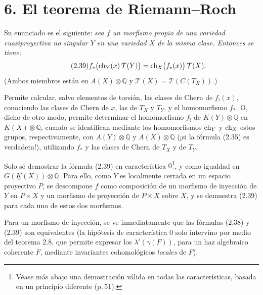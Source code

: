 \providecommand{\sisi}[2]{#2}

\section*{6. El teorema de Riemann--Roch}

Su enunciado es el siguiente: \emph{sea \(f\) un morfismo propio de una variedad cuasiproyectiva no singular \(Y\) en una variedad \(X\) de la misma clase. Entonces se tiene:}
\begin{equation}\tag{2.39}
 f_*\bigl(\operatorname{ch}_Y(x)\,\mathcal T(Y)\bigr)
 =
 \operatorname{ch}_X\bigl(f_*(x)\bigr)\,\mathcal T(X).
\end{equation}
(Ambos miembros están en \(A(X)\otimes\mathbb Q\) y \(\mathcal T(X)=\mathcal T(C(T_X))\).)

Permite calcular, salvo elementos de torsión, las clases de Chern de \(f_!(x)\), conociendo las clases de Chern de \(x\), las de \(T_X\) y \(T_Y\), y el homomorfismo \(f_*\). O, dicho de otro modo, permite determinar el homomorfismo
\(f_!\) de \(\underline K(Y)\otimes\mathbb Q\) en \(\underline K(X)\otimes\mathbb Q\), cuando se identifican mediante los homomorfismos \(\operatorname{ch}_Y\) y \(\operatorname{ch}_X\) estos grupos, respectivamente, con \(A(Y)\otimes\mathbb Q\) y \(A(X)\otimes\mathbb Q\) (¡si la fórmula (2.35) es verdadera!), utilizando \(f_*\) y las clases de Chern de \(T_X\) y de \(T_Y\).

Solo sé demostrar la fórmula (2.39) en característica \(0\)\footnote{Véase más abajo una demostración válida en todas las características, basada en un principio diferente (p.\,51).}, y como igualdad en \(G(\underline K(X))\otimes\mathbb Q\). Para ello, como \(Y\) es localmente cerrada en un espacio proyectivo \(P\), se descompone \(f\) como composición de un morfismo de inyección de \(Y\) en \(P\times X\) y un morfismo de proyección de \(P\times X\) sobre \(X\), y se demuestra (2.39) para cada uno de estos dos morfismos\sisi{..}{.}

Para un morfismo de inyección, se ve inmediatamente que las fórmulas (2.38) y (2.39) son equivalentes (la hipótesis de característica \(0\) solo intervino por medio del teorema 2.8, que permite expresar los \(\lambda^i(\gamma(F))\), para un haz algebraico coherente \(F\), mediante invariantes cohomológicos \emph{locales} de \(F\)).

